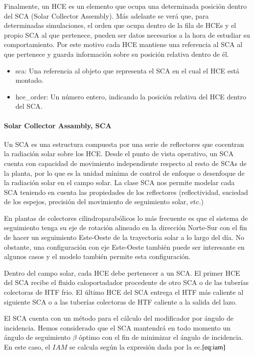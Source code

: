 Finalmente, un HCE es un elemento que ocupa una determinada posición dentro del SCA (Solar Collector Assembly). Más adelante se verá que, para determinadas simulaciones, el orden que ocupa dentro de la fila de HCEs y el propio SCA al que pertenece, pueden ser datos necesarios a la hora de estudiar su comportamiento. Por este motivo cada HCE mantiene una referencia al SCA al que pertenece y guarda información sobre su posición relativa dentro de él. 
\begin{itemize}
\item
  sca: Una referencia al objeto que representa el SCA en el cual el HCE
  está montado.
\item
  hce\_order: Un número entero, indicando la posición relativa del HCE
  dentro del SCA.
\end{itemize}

\hypertarget{solar-collector-assambly-sca}{%
\paragraph{Solar Collector Assambly,
SCA}\label{solar-collector-assambly-sca}}

Un SCA es una estructura compuesta por una serie de reflectores que cocentran la radiación solar sobre los HCE. Desde el punto de vista operativo, un SCA cuenta con capacidad de movimiento independiente respecto al resto de SCAs de la planta, por lo que es la unidad mínima de control de enfoque o desenfoque de la radiación solar en el campo solar. La clase SCA nos permite modelar cada SCA teniendo en cuenta las propiedades de los reflectores (reflectividad, suciedad de los espejos, precisión del movimiento de seguimiento solar, etc.)

En plantas de colectores cilindroparabólicos lo más frecuente es que el sistema de seguimiento tenga su eje de rotación alineado en la dirección Norte-Sur con el fin de hacer un seguimiento Este-Oeste de la trayectoria solar a lo largo del día. No obstante, una configuración con eje Este-Oeste también puede ser interesante en algunos casos y el modelo también permite esta configuración.

Dentro del campo solar, cada HCE debe pertenecer a un SCA. El primer HCE del SCA recibe el fluido caloportadador procedente de otro SCA o de las tuberías colectoras de HTF frio. El último HCE del SCA entrega el HTF más caliente al siguiente SCA o a las tuberías colectoras de HTF caliente a la salida del lazo.

El SCA cuenta con un método para el cálculo del modificador por ángulo de incidencia. Hemos considerado que el SCA mantendrá en todo momento un ángulo de seguimiento \(\beta\) óptimo con el fin de minimizar el ángulo de incidencia. En este caso, el \(IAM\) se calcula según la expresión dada por la ec.\(\eqref{eq:iam}\)

